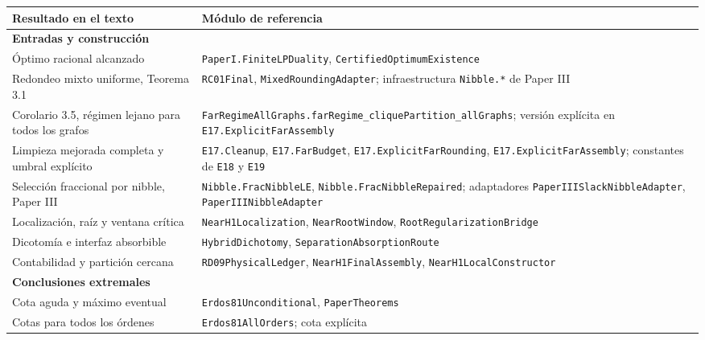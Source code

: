\documentclass[spanish,11pt,a4paper]{article}
\newcounter{none}
\begin{document}
{\def\LTcaptype{none} %
\begin{longtable}[]{@{}
  >{\raggedright\arraybackslash}p{}
  >{\raggedright\arraybackslash}p{}@{}}
\toprule\noalign{}
\begin{minipage}[b]{\linewidth}\raggedright
Resultado en el texto
\end{minipage} & \begin{minipage}[b]{\linewidth}\raggedright
Módulo de referencia
\end{minipage} \\
\midrule\noalign{}
\endhead
\bottomrule\noalign{}
\endlastfoot
\textbf{Entradas y construcción} & \\
Óptimo racional alcanzado & \nolinkurl{PaperI.FiniteLPDuality},
\nolinkurl{CertifiedOptimumExistence} \\
Redondeo mixto uniforme, Teorema 3.1 & \nolinkurl{RC01Final},
\nolinkurl{MixedRoundingAdapter}; infraestructura \nolinkurl{Nibble.*} de
Paper III \\
Corolario 3.5, régimen lejano para todos los grafos &
\nolinkurl{FarRegimeAllGraphs.farRegime_cliquePartition_allGraphs};
versión explícita en \nolinkurl{E17.ExplicitFarAssembly} \\
Limpieza mejorada completa y umbral explícito & \nolinkurl{E17.Cleanup},
\nolinkurl{E17.FarBudget}, \nolinkurl{E17.ExplicitFarRounding},
\nolinkurl{E17.ExplicitFarAssembly}; constantes de \nolinkurl{E18} y
\nolinkurl{E19} \\
Selección fraccional por nibble, Paper III &
\nolinkurl{Nibble.FracNibbleLE}, \nolinkurl{Nibble.FracNibbleRepaired};
adaptadores \nolinkurl{PaperIIISlackNibbleAdapter},
\nolinkurl{PaperIIINibbleAdapter} \\
Localización, raíz y ventana crítica & \nolinkurl{NearH1Localization},
\nolinkurl{NearRootWindow}, \nolinkurl{RootRegularizationBridge} \\
Dicotomía e interfaz absorbible & \nolinkurl{HybridDichotomy},
\nolinkurl{SeparationAbsorptionRoute} \\
Contabilidad y partición cercana & \nolinkurl{RD09PhysicalLedger},
\nolinkurl{NearH1FinalAssembly}, \nolinkurl{NearH1LocalConstructor} \\
\textbf{Conclusiones extremales} & \\
Cota aguda y máximo eventual & \nolinkurl{Erdos81Unconditional},
\nolinkurl{PaperTheorems} \\
Cotas para todos los órdenes & \nolinkurl{Erdos81AllOrders}; cota explícita

\end{longtable}}
\end{document}
